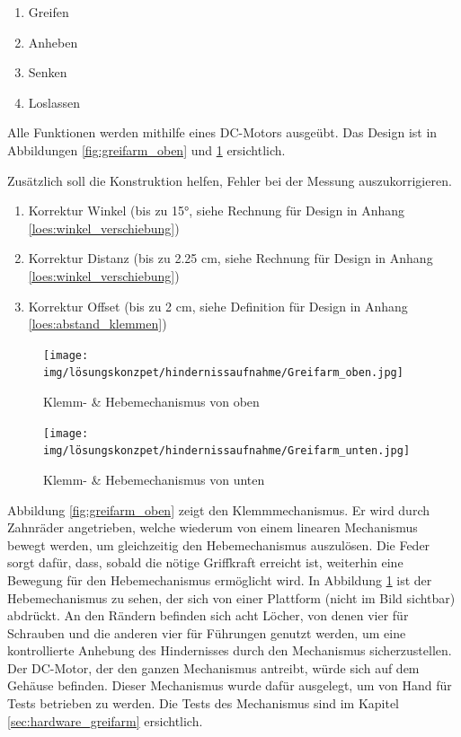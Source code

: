 \documentclass[../main.tex]{subfiles}
\begin{document}
\begin{enumerate}
    \item Greifen
    \item Anheben
    \item Senken
    \item Loslassen
\end{enumerate}

Alle Funktionen werden mithilfe eines DC-Motors ausgeübt. Das Design ist in Abbildungen \ref{fig:greifarm_oben} und \ref{fig:greifarm_unten} ersichtlich.
\newline

Zusätzlich soll die Konstruktion helfen, Fehler bei der Messung auszukorrigieren.
\begin{enumerate}
    \item Korrektur Winkel (bis zu 15°, siehe Rechnung für Design in Anhang \ref{loes:winkel_verschiebung})
    \item Korrektur Distanz (bis zu 2.25 cm, siehe Rechnung für Design in Anhang \ref{loes:winkel_verschiebung})
    \item Korrektur Offset (bis zu 2 cm, siehe Definition für Design in Anhang \ref{loes:abstand_klemmen})
\end{enumerate}

\begin{figure}[h!]
    \centering
    \begin{minipage}[t]{0.45\textwidth}
        \centering
        \texttt{[image: img/lösungskonzpet/hindernissaufnahme/Greifarm\_oben.jpg]}
        \caption{Klemm- \& Hebemechanismus von oben}
        \label{fig:greifarm_oben}
    \end{minipage}
    \hfill
    \begin{minipage}[t]{0.45\textwidth}
        \centering
        \texttt{[image: img/lösungskonzpet/hindernissaufnahme/Greifarm\_unten.jpg]}
        \caption{Klemm- \& Hebemechanismus von unten}
        \label{fig:greifarm_unten}
    \end{minipage}
\end{figure}
\newpage
Abbildung \ref{fig:greifarm_oben} zeigt den Klemmmechanismus. Er wird durch Zahnräder angetrieben, welche wiederum von einem linearen Mechanismus bewegt werden, um gleichzeitig den Hebemechanismus auszulösen. Die Feder sorgt dafür, dass, sobald die nötige Griffkraft erreicht ist, weiterhin eine Bewegung für den Hebemechanismus ermöglicht wird. In Abbildung \ref{fig:greifarm_unten} ist der Hebemechanismus zu sehen, der sich von einer Plattform (nicht im Bild sichtbar) abdrückt. An den Rändern befinden sich acht Löcher, von denen vier für Schrauben und die anderen vier für Führungen genutzt werden, um eine kontrollierte Anhebung des Hindernisses durch den Mechanismus sicherzustellen.
Der DC-Motor, der den ganzen Mechanismus antreibt, würde sich auf dem Gehäuse befinden. Dieser Mechanismus wurde dafür ausgelegt, um von Hand für Tests betrieben zu werden. Die Tests des Mechanismus sind im Kapitel \ref{sec:hardware_greifarm} ersichtlich.
\end{document}
